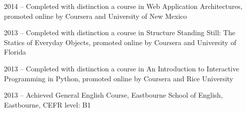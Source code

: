 \documentclass[english,a4paper]{europasscv}
\begin{document}
\begin{europasscv}
\begin{en}
{\begin{ecvitemize}
     \item 2014	-- Completed with distinction a course in Web Application Architectures, promoted online by Coursera and University of New Mexico
     \item 2013 -- Completed with distinction a course in Structure Standing Still: The Statics of Everyday Objects, promoted online by Coursera and University of Florida
     \item 2013 -- Completed with distinction a course in An Introduction to Interactive Programming in Python, promoted online by Coursera and Rice University
     \item 2013 -- Achieved General English Course, Eastbourne School of English, Eastbourne, CEFR level: B1
  \end{ecvitemize}
  } 
  
  
\end{en}

\begin{it}
  

\end{it}
\end{europasscv}
\end{document}
